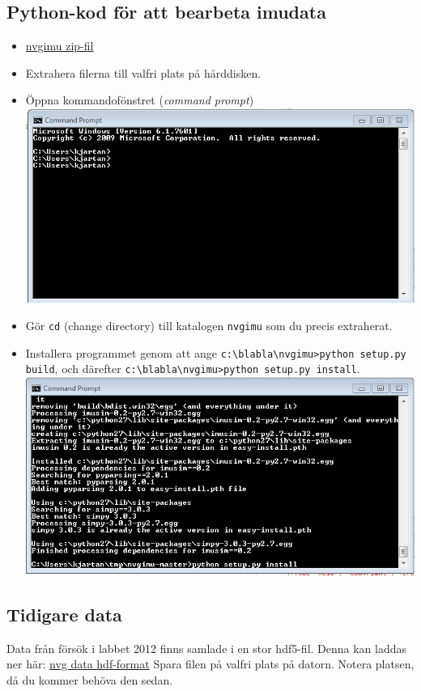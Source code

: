 \documentclass[captions=tableheading]{scrartcl}
\begin{document}
\subsection{Python-kod för att bearbeta imudata}
\label{sec-2-2}
\begin{itemize}
\item \href{https://github.com/alfkjartan/nvgimu/archive/master.zip}{nvgimu zip-fil}
\item Extrahera filerna till valfri plats på hårddisken.
\item Öppna kommandofönstret (\emph{command prompt})
\includegraphics[width=0.4\linewidth]{commandprompt1}
\item Gör \texttt{cd} (change directory) till katalogen \texttt{nvgimu} som du precis extraherat.
\item Installera programmet genom att ange \texttt{c:\textbackslash{}blabla\textbackslash{}nvgimu>python setup.py build}, och därefter \texttt{c:\textbackslash{}blabla\textbackslash{}nvgimu>python setup.py install}.
\includegraphics[width=0.4\linewidth]{commandprompt2}
\end{itemize}
\subsection{Tidigare data}
\label{sec-2-3}
Data från försök i labbet 2012 finns samlade i en stor hdf5-fil. Denna kan laddas ner här:
\href{https://dl.dropboxusercontent.com/u/10481140/nvg201209.hdf5}{nvg data hdf-format}
Spara filen på valfri plats på datorn. Notera platsen, då du kommer behöva den sedan.
\end{document}
